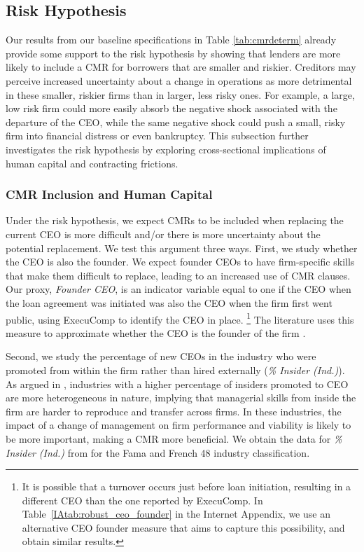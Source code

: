 \documentclass[a4paper,12pt]{article}
\begin{document}
\subsection{Risk Hypothesis}

Our results from our baseline specifications in Table \ref{tab:cmrdeterm} already provide some support to the risk hypothesis by showing that lenders are more likely to include a CMR for borrowers that are smaller and riskier.
Creditors may perceive increased uncertainty about a change in operations as more detrimental in these smaller, riskier firms than in larger, less risky ones. 
For example, a large, low risk firm could more easily absorb the negative shock associated with the departure of the CEO, while the same negative shock could push a small, risky firm into financial distress or even bankruptcy.
This subsection further investigates the risk hypothesis by exploring cross-sectional implications of human capital and contracting frictions.





\subsubsection{CMR Inclusion and Human Capital} \label{section:inclusion_humancap}

Under the risk hypothesis, we expect CMRs to be included when replacing the current CEO is more difficult and/or there is more uncertainty about the potential replacement.
We test this argument three ways.
First, we study whether the CEO is also the founder.
We expect founder CEOs to have firm-specific skills that make them difficult to replace, leading to an increased use of CMR clauses.
Our proxy, \textit{Founder CEO}, is an indicator variable equal to one if the CEO when the loan agreement was initiated was also the CEO when the firm first went public, using ExecuComp to identify the CEO in place.%
  \footnote{It is possible that a turnover occurs just before loan initiation, resulting in a different CEO than the one reported by ExecuComp. In Table~\ref{IAtab:robust_ceo_founder} in the Internet Appendix, we use an alternative CEO founder measure that aims to capture this possibility, and obtain similar results.} 
The literature uses this measure to approximate whether the CEO is the founder of the firm \citep[see, e.g.,][]{Bebchuk_2011}.



Second, we study the percentage of new CEOs in the industry who were promoted from within the firm rather than hired externally (\textit{\% Insider (Ind.)}).
As argued in \cite{Cremers_2014}, industries with a higher percentage of insiders promoted to CEO are more heterogeneous in nature, implying that managerial skills from inside the firm are harder to reproduce and transfer across firms.
In these industries, the impact of a change of management on firm performance and viability is likely to be more important, making a CMR more beneficial.
We obtain the data for \textit{\% Insider (Ind.)} from \cite{Cremers_2014} for the Fama and French 48 industry classification.
\end{document}
